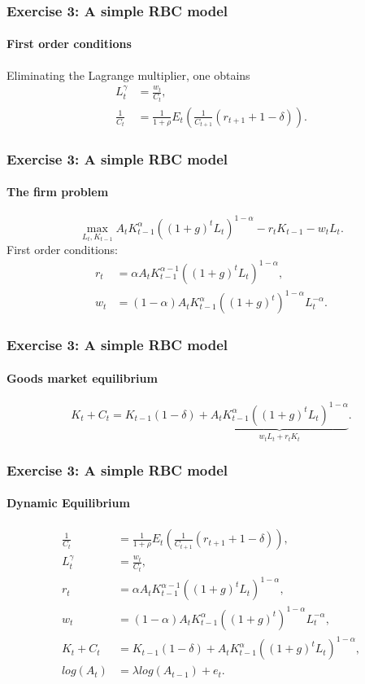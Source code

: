 \documentclass{beamer} %
\begin{document}
\begin{frame}  \frametitle{Exercise 3: A simple RBC model} \framesubtitle{First order conditions}
Eliminating the Lagrange multiplier, one obtains
\begin{align*}
L_t^\gamma&=\frac{w_t}{C_t},\\
\frac{1}{C_t}&=\frac{1}{1+\rho}E_t\left(\frac{1}{C_{t+1}}(r_{t+1}+1-\delta)\right).
\end{align*}

\end{frame}

\begin{frame}  \frametitle{Exercise 3: A simple RBC model}
  \framesubtitle{The firm problem}
  \[
  \max_{L_t,K_{t-1}} A_tK_{t-1}^\alpha\left( \left( 1+g\right) ^{t}L_t\right)^{1-\alpha}-r_tK_{t-1}-w_tL_t.
  \]
First order conditions:
\begin{align*}
  r_t &= \alpha A_tK_{t-1}^{\alpha-1}\left( \left( 1+g\right) ^{t}L_t\right)^{1-\alpha},\\
  w_t &= (1-\alpha) A_tK_{t-1}^\alpha\left( \left( 1+g\right) ^{t}\right)^{1-\alpha}L_t^{-\alpha}.
\end{align*}
\end{frame}

\begin{frame}\frametitle{Exercise 3: A simple RBC model}
  \framesubtitle{Goods market equilibrium}
  \[
  K_t+C_t = K_{t-1}(1-\delta)+\underbrace{A_tK_{t-1}^\alpha\left( \left( 1+g\right) ^{t}L_t\right)^{1-\alpha}}_{w_t L_t + r_t K_t}.
  \]
\end{frame}

\begin{frame}\frametitle{Exercise 3: A simple RBC model}
  \framesubtitle{Dynamic Equilibrium}
  \begin{align*}
    \frac{1}{C_t}&=\frac{1}{1+\rho}E_t\left(\frac{1}{C_{t+1}}(r_{t+1}+1-\delta)\right),\\
    L_t^\gamma&=\frac{w_t}{C_t},\\
    r_t &= \alpha A_tK_{t-1}^{\alpha-1}\left( \left( 1+g\right) ^{t}L_t\right)^{1-\alpha},\\
    w_t &= (1-\alpha) A_tK_{t-1}^\alpha\left( \left( 1+g\right) ^{t}\right)^{1-\alpha}L_t^{-\alpha},\\
    K_t+C_t &= K_{t-1}(1-\delta)+A_tK_{t-1}^\alpha\left( \left( 1+g\right) ^{t}L_t\right)^{1-\alpha},\\
        log(A_{t})&=\lambda log(A_{t-1}) + e_{t}.
  \end{align*}
\end{frame}
\end{document}
